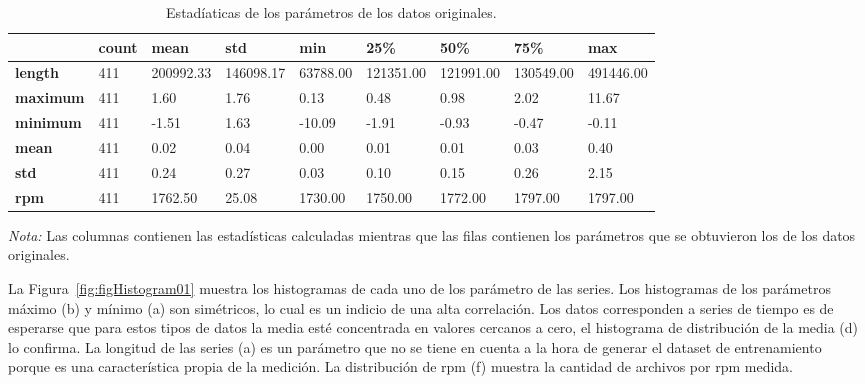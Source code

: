 \documentclass[11pt,a4paper,spanish]{book}
\numberwithin{equation}{chapter}
\numberwithin{figure}{chapter}
\begin{document}
\begin{table}[h]
\caption{Estadíaticas de los parámetros de los datos originales.}
\centering
\renewcommand{\arraystretch}{1.2}
\footnotesize
\begin{tabularx}{\textwidth}{|l|X|X|X|X|X|X|X|X|}
    \hline
    \textbf{ } & \textbf{count} & \textbf{mean} & \textbf{std} & \textbf{min} & \textbf{25\%} & \textbf{50\%} & \textbf{75\%} & \textbf{max} \\
    \hline
    \textbf{length} & 411 & 200992.33 & 146098.17 & 63788.00 & 121351.00 & 121991.00 & 130549.00 & 491446.00 \\
    \hline
    \textbf{maximum} & 411 & 1.60 & 1.76 & 0.13 & 0.48 & 0.98 & 2.02 & 11.67 \\
    \hline
    \textbf{minimum} & 411 & -1.51 & 1.63 & -10.09 & -1.91 & -0.93 & -0.47 & -0.11 \\
    \hline
    \textbf{mean} & 411 & 0.02 & 0.04 & 0.00 & 0.01 & 0.01 & 0.03 & 0.40 \\
    \hline
    \textbf{std} & 411 & 0.24 & 0.27 & 0.03 & 0.10 & 0.15 & 0.26 & 2.15 \\
    \hline
    \textbf{rpm} & 411 & 1762.50 & 25.08 & 1730.00 & 1750.00 & 1772.00 & 1797.00 & 1797.00 \\
    \hline
\end{tabularx}
\label{tab:stats}
\vspace{2mm}
\parbox{\textwidth}{\footnotesize \textit{Nota:} Las columnas contienen las estadísticas calculadas mientras que las filas contienen los parámetros que se obtuvieron los de los datos originales.}
\end{table}


La Figura~\ref{fig:figHistogram01} muestra los histogramas de cada uno de los parámetro 
de las series. Los histogramas de los parámetros máximo (b) y mínimo (a) son simétricos, 
lo cual es un indicio de una alta correlación. Los datos corresponden a series de 
tiempo es de esperarse que para estos tipos de datos la media esté concentrada en 
valores cercanos a cero, el histograma de distribución de la media (d) lo confirma. 
La longitud de las series (a) es un parámetro que no se tiene en cuenta a la hora de 
generar el dataset de entrenamiento porque es una característica propia de la medición. 
La distribución de rpm (f) muestra la cantidad de archivos por rpm medida.    
\end{document}
